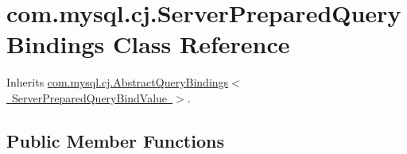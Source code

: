 \hypertarget{classcom_1_1mysql_1_1cj_1_1_server_prepared_query_bindings}{}\section{com.\+mysql.\+cj.\+Server\+Prepared\+Query\+Bindings Class Reference}
\label{classcom_1_1mysql_1_1cj_1_1_server_prepared_query_bindings}


Inherits \mbox{\hyperlink{classcom_1_1mysql_1_1cj_1_1_abstract_query_bindings}{com.\+mysql.\+cj.\+Abstract\+Query\+Bindings$<$ Server\+Prepared\+Query\+Bind\+Value $>$}}.

\subsection*{Public Member Functions}
